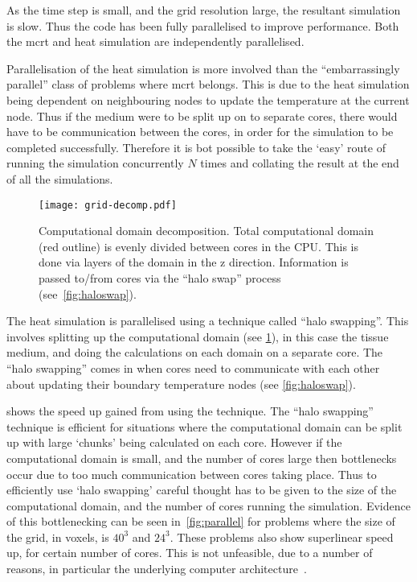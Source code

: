 As the time step is small, and the grid resolution large, the resultant simulation is slow. Thus the code has been fully parallelised to improve performance. Both the \gls*{mcrt} and heat simulation are independently parallelised. 

\medskip

Parallelisation of the heat simulation is more involved than the ``embarrassingly parallel'' class of problems where \gls*{mcrt} belongs. This is due to the heat simulation being dependent on neighbouring nodes to update the temperature at the current node. Thus if the medium were to be split up on to separate cores, there would have to be communication between the cores, in order for the simulation to be completed successfully. Therefore it is bot possible to take the `easy' route of running the simulation concurrently $N$ times and collating the result at the end of all the simulations.


\begin{figure}
\vspace{-45pt}
\centering
\texttt{[image: grid-decomp.pdf]}
\caption{Computational domain decomposition. Total computational domain (red outline) is evenly divided between cores in the CPU. This is done via layers of the domain in the z direction. Information is passed to/from cores via the ``halo swap'' process (see~\cref{fig:haloswap}).}
\label{fig:griddecomp}
\vspace{-10pt}
\end{figure}

The heat simulation is parallelised using a technique called ``halo swapping''. This involves splitting up the computational domain (see \cref{fig:griddecomp}), in this case the tissue medium, and doing the calculations on each domain on a separate core. The ``halo swapping'' comes in when cores need to communicate with each other about updating their boundary temperature nodes (see \cref{fig:haloswap}).

 shows the speed up gained from using the technique. The ``halo swapping'' technique is efficient for situations where the computational domain can be split up with large `chunks' being calculated on each core. However if the computational domain is small, and the number of cores large then bottlenecks occur due to too much communication between cores taking place. Thus to efficiently use `halo swapping' careful thought has to be given to the size of the computational domain, and the number of cores running the simulation. Evidence of this bottlenecking can be seen in~\cref{fig:parallel} for problems where the size of the grid, in voxels, is $40^3$ and $24^3$. These problems also show superlinear speed up, for certain number of cores. This is not unfeasible, due to a number of reasons, in particular the underlying computer architecture~\cite{ristov2016superlinear}.


